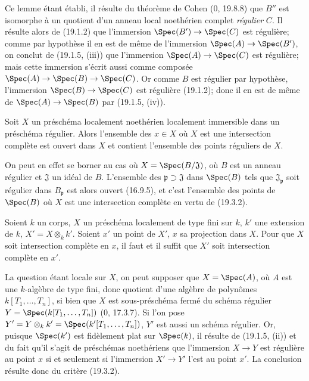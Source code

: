 Ce lemme étant établi, il résulte du théorème de Cohen ($0$, 19.8.8) que $B''$ est isomorphe à un quotient d'un anneau local noethérien complet \emph{régulier} $C$. Il résulte alors de (19.1.2) que l'immersion $\Spec(B')\to\Spec(C)$ est régulière; comme par hypothèse il en est de même de l'immersion $\Spec(A)\to\Spec(B')$, on conclut de (19.1.5, (iii)) que l'immersion $\Spec(A)\to\Spec(C)$ est régulière; mais cette immersion s'écrit aussi comme composée $\Spec(A)\to\Spec(B)\to\Spec(C)$. Or comme $B$ est régulier par hypothèse, l'immersion $\Spec(B)\to\Spec(C)$ est régulière (19.1.2); donc il en est de même de $\Spec(A)\to\Spec(B)$ par (19.1.5, (iv)).

\begin{corollary}[19.3.3]
\label{IV.19.3.3}
Soit $X$ un préschéma localement noethérien localement immersible dans un préschéma régulier. Alors l'ensemble des $x\in X$ où $X$ est une intersection complète est ouvert dans $X$ et contient l'ensemble des points réguliers de $X$.
\end{corollary}

On peut en effet se borner au cas où $X=\Spec(B/\mathfrak J)$, où $B$ est un anneau régulier et $\mathfrak J$ un idéal de $B$. L'ensemble des $\mathfrak p\supset\mathfrak J$ dans $\Spec(B)$ tels que $\mathfrak J_{\mathfrak p}$ soit régulier dans $B_{\mathfrak p}$ est alors ouvert (16.9.5), et c'est l'ensemble des points de $\Spec(B)$ où $X$ est une intersection complète en vertu de (19.3.2).

\begin{corollary}[19.3.4]
\label{IV.19.3.4}
Soient $k$ un corps, $X$ un préschéma localement de type fini sur $k$, $k'$ une extension de $k$, $X'=X\otimes_k k'$. Soient $x'$ un point de $X'$, $x$ sa projection dans $X$. Pour que $X$ soit intersection complète en $x$, il faut et il suffit que $X'$ soit intersection complète en $x'$.
\end{corollary}

La question étant locale sur $X$, on peut supposer que $X=\Spec(A)$, où $A$ est une $k$-algèbre de type fini, donc quotient d'une algèbre de polynômes $k[T_1,\ldots,T_n]$, si bien que $X$ est sous-préschéma fermé du schéma régulier $Y=\Spec(k[T_1,\ldots,T_n])$ ($0$, 17.3.7). Si l'on pose $Y'=Y\otimes_k k'=\Spec(k'[T_1,\ldots,T_n])$, $Y'$ est aussi un schéma régulier. Or, puisque $\Spec(k')$ est fidèlement plat sur $\Spec(k)$, il résulte de (19.1.5, (ii)) et du fait qu'il s'agit de préschémas noethériens que l'immersion $X\to Y$ est régulière au point $x$ si et seulement si l'immersion $X'\to Y'$ l'est au point $x'$. La conclusion résulte donc du critère (19.3.2).

